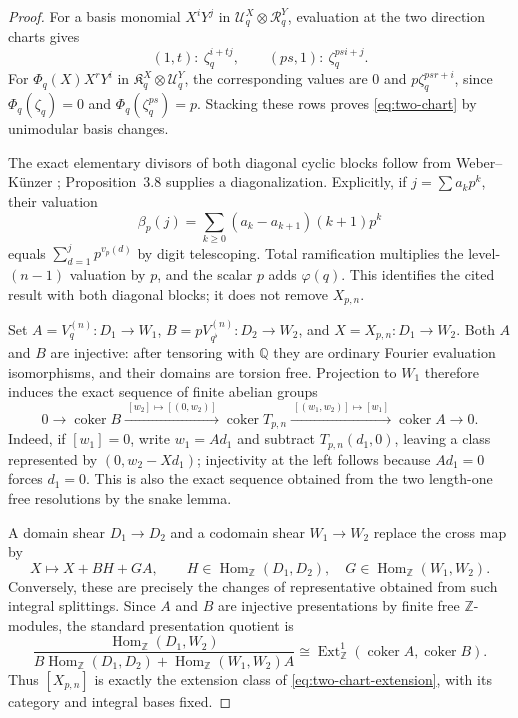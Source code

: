 \documentclass[12pt,a4paper]{article}
\theoremstyle{definition}
\newcommand{\Z}{\mathbb Z}
\newcommand{\Q}{\mathbb Q}
\newcommand{\coker}{\operatorname{coker}}
\begin{document}
\begin{proof}
For a basis monomial $X^iY^j$ in
$\mathscr U_q^X\otimes\mathscr R_q^Y$, evaluation at the two
direction charts gives
\[
 (1,t):\ \zeta_q^{i+tj},
 \qquad (ps,1):\ \zeta_q^{psi+j}.
\]
For $\Phi_q(X)X^rY^i$ in
$\mathfrak K_q^X\otimes\mathscr U_q^Y$, the corresponding values are
$0$ and $p\zeta_q^{psr+i}$, since
$\Phi_q(\zeta_q)=0$ and $\Phi_q(\zeta_q^{ps})=p$.  Stacking these rows
proves \eqref{eq:two-chart} by unimodular basis changes.

The exact elementary divisors of both diagonal cyclic blocks follow from
Weber--K\"unzer \cite[Proposition~3.15]{WK04}; Proposition~3.8 supplies a
diagonalization.  Explicitly, if $j=\sum a_kp^k$, their valuation
\[
 \beta_p(j)=\sum_{k\geq0}(a_k-a_{k+1})(k+1)p^k
\]
equals $\sum_{d=1}^jp^{v_p(d)}$ by digit telescoping.  Total ramification
multiplies the level-$(n-1)$ valuation by $p$, and the scalar $p$ adds
$\varphi(q)$.  This identifies the cited result with both diagonal blocks;
it does not remove $X_{p,n}$.

Set $A=V_q^{(n)}:D_1\to W_1$,
$B=pV_{q^\flat}^{(n)}:D_2\to W_2$, and $X=X_{p,n}:D_1\to W_2$.
Both $A$ and $B$ are injective: after tensoring with $\Q$ they are ordinary
Fourier evaluation isomorphisms, and their domains are torsion free.  Projection
to $W_1$ therefore induces the exact sequence of finite abelian groups
\begin{equation}\label{eq:two-chart-extension}
 0\longrightarrow\coker B
 \xrightarrow{\ [w_2]\mapsto[(0,w_2)]\ }
 \coker T_{p,n}
 \xrightarrow{\ [(w_1,w_2)]\mapsto[w_1]\ }
 \coker A\longrightarrow0.
\end{equation}
Indeed, if $[w_1]=0$, write $w_1=Ad_1$ and subtract
$T_{p,n}(d_1,0)$, leaving a class represented by $(0,w_2-Xd_1)$; injectivity
at the left follows because $Ad_1=0$ forces $d_1=0$.  This is also the exact
sequence obtained from the two length-one free resolutions by the snake
lemma.

A domain shear $D_1\to D_2$ and a codomain shear $W_1\to W_2$ replace the
cross map by
\[
 X\longmapsto X+BH+GA,\qquad
 H\in\operatorname{Hom}_{\Z}(D_1,D_2),\quad
 G\in\operatorname{Hom}_{\Z}(W_1,W_2).
\]
Conversely, these are precisely the changes of representative obtained from
such integral splittings.  Since $A$ and $B$ are injective presentations by
finite free $\Z$-modules, the standard presentation quotient is
\[
 \frac{\operatorname{Hom}_{\Z}(D_1,W_2)}
 {B\operatorname{Hom}_{\Z}(D_1,D_2)
  +\operatorname{Hom}_{\Z}(W_1,W_2)A}
 \cong
 \operatorname{Ext}^1_{\Z}(\coker A,\coker B).
\]
Thus $[X_{p,n}]$ is exactly the extension class of
\eqref{eq:two-chart-extension}, with its category and integral bases fixed.


\end{proof}
\end{document}
